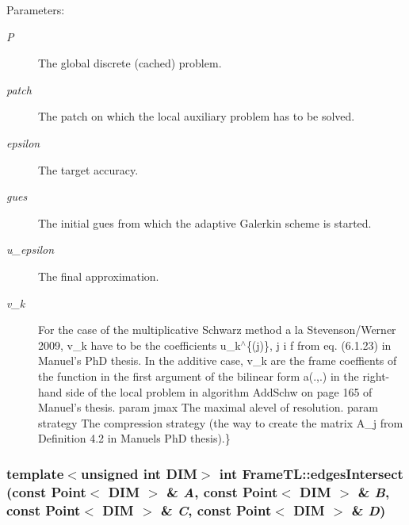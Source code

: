 \begin{Desc}
\item[Parameters:]
\begin{description}
\item[{\em P}]The global discrete (cached) problem. \item[{\em patch}]The patch on which the local auxiliary problem has to be solved. \item[{\em epsilon}]The target accuracy. \item[{\em gues}]The initial gues from which the adaptive Galerkin scheme is started. \item[{\em u\_\-epsilon}]The final approximation. \item[{\em v\_\-k}]For the case of the multiplicative Schwarz method a la Stevenson/Werner 2009, v\_\-k have to be the coefficients u\_\-k$^\wedge$\{(j)\}, j i f from eq. (6.1.23) in Manuel's PhD thesis. In the additive case, v\_\-k are the frame coeffients of the function in the first argument of the bilinear form a(.,.) in the right-hand side of the local problem in algorithm AddSchw on page 165 of Manuel's thesis. param jmax The maximal alevel of resolution. param strategy The compression strategy (the way to create the matrix A\_\-j from Definition 4.2 in Manuels PhD thesis).\} \end{description}
\end{Desc}
\hypertarget{namespaceFrameTL_179a53ae796b31d73b591456b7e8240e}{
\subsubsection[edgesIntersect]{\setlength{\rightskip}{0pt plus 5cm}template$<$unsigned int DIM$>$ int FrameTL::edgesIntersect (const Point$<$ DIM $>$ \& {\em A}, \/  const Point$<$ DIM $>$ \& {\em B}, \/  const Point$<$ DIM $>$ \& {\em C}, \/  const Point$<$ DIM $>$ \& {\em D})}}
\label{namespaceFrameTL_179a53ae796b31d73b591456b7e8240e}


